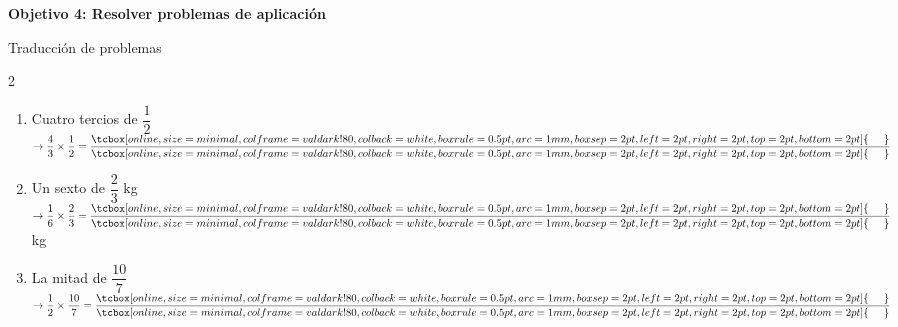 \documentclass[12pt, letterpaper]{article}
\newenvironment{objetivo}[1]{%
    \begin{tcolorbox}[colback=valblue!10, colframe=valblue, arc=2mm, boxrule=1.5pt]
        {\large\bfseries \ding{118} #1}
    \end{tcolorbox}
}{}
\newcommand{\boxfill}[1][0.8cm]{\tcbox[on line, size=minimal, colframe=valdark!80, colback=white, boxrule=0.5pt, arc=1mm, boxsep=2pt, left=2pt, right=2pt, top=2pt, bottom=2pt]{\makebox[#1]{\vphantom{M}}}}
\begin{document}
\begin{objetivo}{Objetivo 4: Resolver problemas de aplicación}
\begin{practica}{Traducción de problemas }
\begin{multicols}{2}
\begin{enumerate}[itemsep=0.4cm]
                \item Cuatro tercios de $\dfrac{1}{2}$ $\rightarrow \dfrac{4}{3} \times \dfrac{1}{2} = \dfrac{\boxfill[0.5cm]}{\boxfill[0.5cm]}$
                \item Un sexto de $\dfrac{2}{3}$ kg $\rightarrow \dfrac{1}{6} \times \dfrac{2}{3} = \dfrac{\boxfill[0.5cm]}{\boxfill[0.5cm]}$ kg
                \item La mitad de $\dfrac{10}{7}$ $\rightarrow \dfrac{1}{2} \times \dfrac{10}{7} = \dfrac{\boxfill[0.5cm]}{\boxfill[0.5cm]}$
            \end{enumerate}
        \end{multicols}
    \end{practica}
\end{objetivo}

\end{document}
